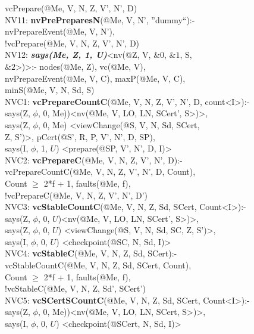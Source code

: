 \begin{code}
\> vcPrepare(@Me, V, N, Z, V', N', D)\\
NV11: \textbf{nvPrePreparesN}(@Me, V, N', ''dummy``):-\\
\> nvPrepareEvent(@Me, V, N'), \\
\> !vcPrepare(@Me, V, N, Z, V', N', D)\\
NV12: \textbf{\textit{says(Me, Z, 1, U)}}<nv(@Z, V, $\&0$, $\&1$, S, \\
\> $\&2$>)>:- nodes(@Me, Z), vc(@Me, V), \\
\> nvPrepareEvent(@Me, V, C), maxP(@Me, V, C), \\
\> minS(@Me, V, N, Sd, S)\\
NVC1: \textbf{vcPrepareCountC}(@Me, V, N, Z, V', N', D, count<I>):-\\
\> says(Z, $\phi$, 0, Me))<nv(@Me, V, LO, LN, SCert', S>)>,\\
\> says(Z, $\phi$, 0, Me) <viewChange(@S, V, N, Sd, SCert, \\
\> Z, S')>, pCert(@S', R, P, V', N', D, SP),\\
\> says(I, $\phi$, 1, $U$) <prepare(@SP, V', N', D, I)>\\
NVC2: \textbf{vcPrepareC}(@Me, V, N, Z, V', N', D):-\\
\> vcPrepareCountC(@Me, V, N, Z, V', N', D, Count),\\
\> Count $\geq$ 2*f + 1, faults(@Me, f),\\
\> !vcPrepareC(@Me, V, N, Z, V', N', D')\\
NVC3: \textbf{vcStableCountC}(@Me, V, N, Z, Sd, SCert, Count<I>):- \\
\> says(Z, $\phi$, 0, $U$)<nv(@Me, V, LO, LN, SCert', S>)>,\\
\> says(Z, $\phi$, 0, $U$) <viewChange(@S, V, N, Sd, SC, Z, S')>,\\
\> says(I, $\phi$, 0, $U$) <checkpoint(@SC, N, Sd, I)>\\
NVC4: \textbf{vcStableC}(@Me, V, N, Z, Sd, SCert):-\\
\> vcStableCountC(@Me, V, N, Z, Sd, SCert, Count),\\
\> Count $\geq$ 2*f + 1, faults(@Me, f),\\
\> !vcStableC(@Me, V, N, Z, Sd', SCert')\\
NVC5: \textbf{vcSCertSCountC}(@Me, V, N, Z, Sd, SCert, Count<I>):- \\
\> says(Z, $\phi$, 0, Me))<nv(@Me, V, LO, LN, SCert, S>)>,\\
\> says(I, $\phi$, 0, $U$) <checkpoint(@SCert, N, Sd, I)>\\

\end{code}

